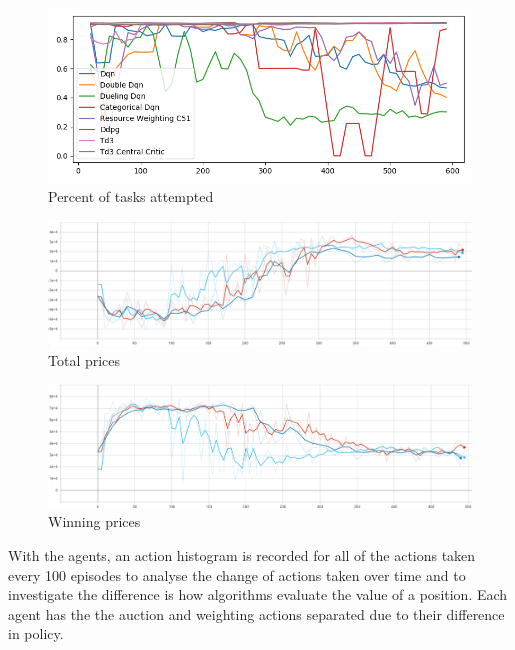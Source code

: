 \begin{figure}[H]
    \centering
    \includegraphics[width=\linewidth]{figures/5_evaluation_figs/algo_training_fig/percent_tasks.png}
    \caption{Percent of tasks attempted}
    \label{fig:algo_percent_tasks}
\end{figure}

\begin{figure}[H]
    \centering
    \includegraphics[width=\linewidth]{figures/5_evaluation_figs/algo_training_fig/total_prices.png}
    \caption{Total prices}
    \label{fig:algo_total_prices}
\end{figure}

\begin{figure}[H]
    \centering
    \includegraphics[width=\linewidth]{figures/5_evaluation_figs/algo_training_fig/total_winning_prices.PNG}
    \caption{Winning prices}
    \label{fig:algo_winning_prices}
\end{figure}

With the agents, an action histogram is recorded for all of the actions taken every 100 episodes to analyse the change
of actions taken over time and to investigate the difference is how algorithms evaluate the value of a position. Each
agent has the the auction and weighting actions separated due to their difference in policy. \\

